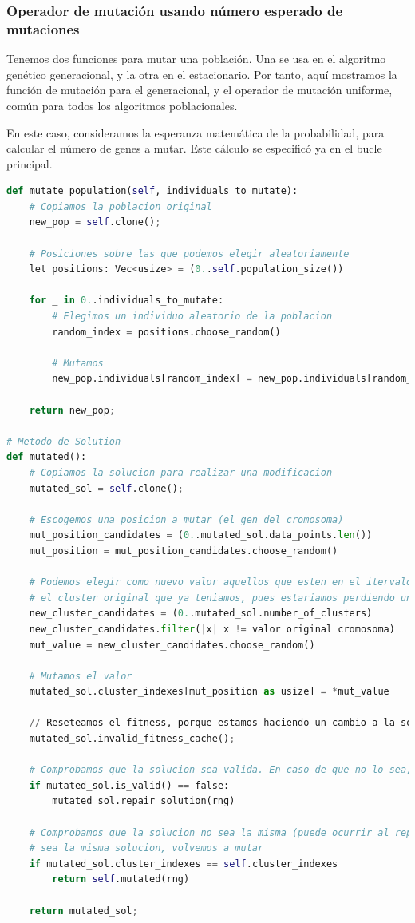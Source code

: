 \documentclass[11pt]{article}
\begin{document}
\subsubsection{Operador de mutación usando número esperado de mutaciones}

Tenemos dos funciones para mutar una población. Una se usa en el algoritmo genético generacional, y la otra en el estacionario. Por tanto, aquí mostramos la función de mutación para el generacional, y el operador de mutación uniforme, común para todos los algoritmos poblacionales.

En este caso, consideramos la esperanza matemática de la probabilidad, para calcular el número de genes a mutar. Este cálculo se especificó ya en el bucle principal.

\begin{lstlisting}[language=Python, style=Boxed]
def mutate_population(self, individuals_to_mutate):
    # Copiamos la poblacion original
    new_pop = self.clone();

    # Posiciones sobre las que podemos elegir aleatoriamente
    let positions: Vec<usize> = (0..self.population_size())

    for _ in 0..individuals_to_mutate:
        # Elegimos un individuo aleatorio de la poblacion
        random_index = positions.choose_random()

        # Mutamos
        new_pop.individuals[random_index] = new_pop.individuals[random_index].mutated()

    return new_pop;

# Metodo de Solution
def mutated():
    # Copiamos la solucion para realizar una modificacion
    mutated_sol = self.clone();

    # Escogemos una posicion a mutar (el gen del cromosoma)
    mut_position_candidates = (0..mutated_sol.data_points.len())
    mut_position = mut_position_candidates.choose_random()

    # Podemos elegir como nuevo valor aquellos que esten en el itervalo adecuado y que no sean
    # el cluster original que ya teniamos, pues estariamos perdiendo una mutacion efectiva
    new_cluster_candidates = (0..mutated_sol.number_of_clusters)
    new_cluster_candidates.filter(|x| x != valor original cromosoma)
    mut_value = new_cluster_candidates.choose_random()

    # Mutamos el valor
    mutated_sol.cluster_indexes[mut_position as usize] = *mut_value

    // Reseteamos el fitness, porque estamos haciendo un cambio a la solucion que devolvemos
    mutated_sol.invalid_fitness_cache();

    # Comprobamos que la solucion sea valida. En caso de que no lo sea, la reparamos
    if mutated_sol.is_valid() == false:
        mutated_sol.repair_solution(rng)

    # Comprobamos que la solucion no sea la misma (puede ocurrir al reparar). En caso de que
    # sea la misma solucion, volvemos a mutar
    if mutated_sol.cluster_indexes == self.cluster_indexes
        return self.mutated(rng)

    return mutated_sol;

\end{lstlisting}
\end{document}
